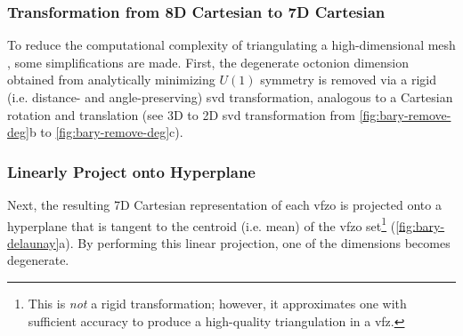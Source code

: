 \documentclass[final,twocolumn,12pt]{elsarticle}
\begin{document}
{\begin{appendices}
\subsubsection{ Transformation from 8D Cartesian to 7D Cartesian}
\label{sec:app:bary:tri:svd1}
 To reduce the computational complexity of triangulating a high-dimensional mesh \cite{barberQuickhullAlgorithmConvex1996}, some simplifications are made. First, the degenerate octonion dimension obtained from analytically minimizing $U(1)$ symmetry \cite{francisGeodesicOctonionMetric2019} is removed via a rigid (i.e. distance- and angle-preserving) \gls{svd} transformation,
analogous to a Cartesian rotation and translation (see 3D to 2D \gls{svd} transformation from \cref{fig:bary-remove-deg}b to \cref{fig:bary-remove-deg}c).

\subsubsection{Linearly Project onto Hyperplane}
\label{sec:app:bary:tri:project}
Next, the resulting 7D Cartesian representation of each \gls{vfzo} is projected onto a hyperplane that is tangent to the centroid (i.e. mean) of the \gls{vfzo} set\footnote{This is \textit{not} a rigid transformation; however, it approximates one with sufficient accuracy to produce a high-quality triangulation in a \gls{vfz}.} (\cref{fig:bary-delaunay}a). By performing this linear projection, one of the dimensions becomes degenerate.


\end{appendices}}
\end{document}
